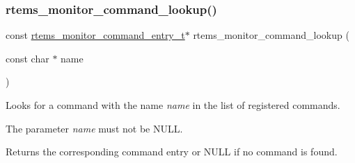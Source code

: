 \subsubsection{\texorpdfstring{rtems\_monitor\_command\_lookup()}{rtems\_monitor\_command\_lookup()}}
{\footnotesize\ttfamily const \mbox{\hyperlink{structrtems__monitor__command__entry__s}{rtems\+\_\+monitor\+\_\+command\+\_\+entry\+\_\+t}}$\ast$ rtems\+\_\+monitor\+\_\+command\+\_\+lookup (\begin{DoxyParamCaption}\item[{const char $\ast$}]{name }\end{DoxyParamCaption})}



Looks for a command with the name {\itshape name} in the list of registered commands. 

The parameter {\itshape name} must not be N\+U\+LL.

Returns the corresponding command entry or N\+U\+LL if no command is found. 